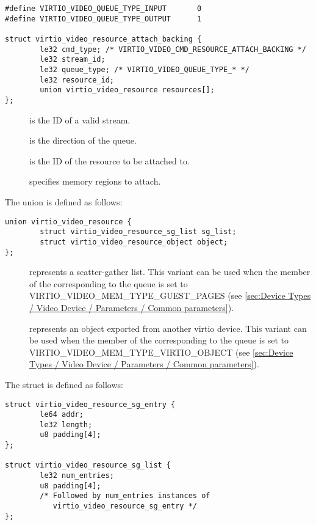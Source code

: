 \begin{lstlisting}
#define VIRTIO_VIDEO_QUEUE_TYPE_INPUT       0
#define VIRTIO_VIDEO_QUEUE_TYPE_OUTPUT      1

struct virtio_video_resource_attach_backing {
        le32 cmd_type; /* VIRTIO_VIDEO_CMD_RESOURCE_ATTACH_BACKING */
        le32 stream_id;
        le32 queue_type; /* VIRTIO_VIDEO_QUEUE_TYPE_* */
        le32 resource_id;
        union virtio_video_resource resources[];
};
\end{lstlisting}

\begin{description}
\item[]
is the ID of a valid stream.
\item[]
is the direction of the queue.
\item[]
is the ID of the resource to be attached to.
\item[]
specifies memory regions to attach.
\end{description}

The union  is defined as follows:

\begin{lstlisting}
union virtio_video_resource {
        struct virtio_video_resource_sg_list sg_list;
        struct virtio_video_resource_object object;
};
\end{lstlisting}

\begin{description}
\item[]
represents a scatter-gather list. This variant can be used when the
 member of the 
corresponding to the queue is set to
VIRTIO\_VIDEO\_MEM\_TYPE\_GUEST\_PAGES (see
\ref{sec:Device Types / Video Device / Parameters / Common parameters}).
\item[]
represents an object exported from another virtio device. This variant
can be used when the  member of the
 corresponding to the queue is set
to VIRTIO\_VIDEO\_MEM\_TYPE\_VIRTIO\_OBJECT (see
\ref{sec:Device Types / Video Device / Parameters / Common parameters}).
\end{description}

The struct  is defined as follows:

\begin{lstlisting}
struct virtio_video_resource_sg_entry {
        le64 addr;
        le32 length;
        u8 padding[4];
};

struct virtio_video_resource_sg_list {
        le32 num_entries;
        u8 padding[4];
        /* Followed by num_entries instances of
           virtio_video_resource_sg_entry */
};
\end{lstlisting}

